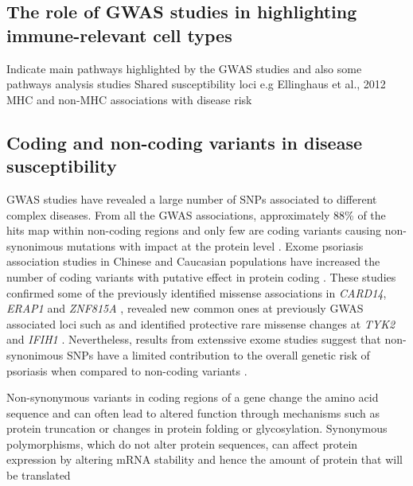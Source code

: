 \subsection{The role of GWAS studies in highlighting immune-relevant cell types}
Indicate main pathways highlighted by the GWAS studies and also some pathways analysis studies
Shared susceptibility loci e.g Ellinghaus et al., 2012
MHC and non-MHC associations with disease risk



\subsection{Coding and non-coding variants in disease susceptibility}

GWAS studies have revealed a large number of SNPs associated to different complex diseases. From all the GWAS associations, approximately 88\% of the hits map within non-coding regions and only few are coding variants causing non-synonimous mutations with impact at the protein level \parencite{Welter2013}. Exome psoriasis association studies in Chinese and Caucasian populations have increased the number of coding variants with putative effect in protein coding \parencite{Tang2014,Zuo2015,Dand2017}. These studies confirmed some of the previously identified missense associations in \textit{CARD14}, \textit{ERAP1} and \textit{ZNF815A} \parencite{Tang2014}, revealed new common ones at previously GWAS associated loci such as  and identified protective rare missense changes at \textit{TYK2} and \textit{IFIH1} \parencite{Dand2017}. Nevertheless, results from extenssive exome studies suggest that non-synonimous SNPs have a limited contribution to the overall genetic risk of psoriasis when compared to non-coding variants \parencite{Tang2014}.


Non-synonymous   variants   in   coding   regions   of   a   gene change the amino acid sequence and can often lead to altered function through mechanisms such as protein truncation or changes in protein folding or glycosylation. 
Synonymous polymorphisms, which do not alter protein sequences, can  affect protein expression by altering   mRNA   stability   and  hence   the   amount   of protein   that   will   be   translated  

